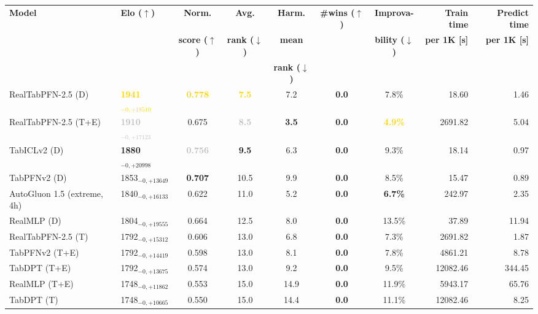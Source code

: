 \begin{tabular}{llcccccrr}
\toprule
\textbf{Model} & \textbf{Elo ($\uparrow$)} & \textbf{Norm.} & \textbf{Avg.} & \textbf{Harm.} & \textbf{\#wins ($\uparrow$)} & \textbf{Improva-} & \textbf{Train time} & \textbf{Predict time} \\
 &  & \textbf{score ($\uparrow$)} & \textbf{rank ($\downarrow$)} & \textbf{mean} &  & \textbf{bility ($\downarrow$)} & \textbf{per 1K [s]} & \textbf{per 1K [s]} \\
 &  &  &  & \textbf{rank ($\downarrow$)} &  &  &  &  \\
\midrule
RealTabPFN-2.5 (D) & \textcolor{gold}{\textbf{1941${}_{-0,+18510}$}} & \textcolor{gold}{\textbf{0.778}} & \textcolor{gold}{\textbf{7.5}} & 7.2 & \textcolor{bronze}{\textbf{0.0}} & 7.8\% & 18.60 & 1.46 \\
RealTabPFN-2.5 (T+E) & \textcolor{silver}{\textbf{1910${}_{-0,+17123}$}} & 0.675 & \textcolor{silver}{\textbf{8.5}} & \textcolor{bronze}{\textbf{3.5}} & \textcolor{bronze}{\textbf{0.0}} & \textcolor{gold}{\textbf{4.9\%}} & 2691.82 & 5.04 \\
TabICLv2 (D) & \textcolor{bronze}{\textbf{1880${}_{-0,+20998}$}} & \textcolor{silver}{\textbf{0.756}} & \textcolor{bronze}{\textbf{9.5}} & 6.3 & \textcolor{bronze}{\textbf{0.0}} & 9.3\% & 18.14 & 0.97 \\
TabPFNv2 (D) & 1853${}_{-0,+13649}$ & \textcolor{bronze}{\textbf{0.707}} & 10.5 & 9.9 & \textcolor{bronze}{\textbf{0.0}} & 8.5\% & 15.47 & 0.89 \\
AutoGluon 1.5 (extreme, 4h) & 1840${}_{-0,+16133}$ & 0.622 & 11.0 & 5.2 & \textcolor{bronze}{\textbf{0.0}} & \textcolor{bronze}{\textbf{6.7\%}} & 242.97 & 2.35 \\
RealMLP (D) & 1804${}_{-0,+19555}$ & 0.664 & 12.5 & 8.0 & \textcolor{bronze}{\textbf{0.0}} & 13.5\% & 37.89 & 11.94 \\
RealTabPFN-2.5 (T) & 1792${}_{-0,+15312}$ & 0.606 & 13.0 & 6.8 & \textcolor{bronze}{\textbf{0.0}} & 7.3\% & 2691.82 & 1.87 \\
TabPFNv2 (T+E) & 1792${}_{-0,+14419}$ & 0.598 & 13.0 & 8.1 & \textcolor{bronze}{\textbf{0.0}} & 7.8\% & 4861.21 & 8.78 \\
TabDPT (T+E) & 1792${}_{-0,+13675}$ & 0.574 & 13.0 & 9.2 & \textcolor{bronze}{\textbf{0.0}} & 9.5\% & 12082.46 & 344.45 \\
RealMLP (T+E) & 1748${}_{-0,+11862}$ & 0.553 & 15.0 & 14.9 & \textcolor{bronze}{\textbf{0.0}} & 11.9\% & 5943.17 & 65.76 \\
TabDPT (T) & 1748${}_{-0,+10665}$ & 0.550 & 15.0 & 14.4 & \textcolor{bronze}{\textbf{0.0}} & 11.1\% & 12082.46 & 8.25 \\

\end{tabular}
